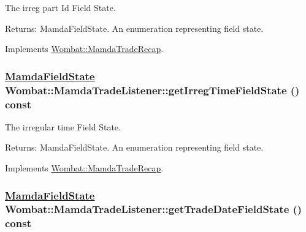 The irreg part Id Field State. 

\begin{Desc}
\item[Returns:]Mamda\-Field\-State. An enumeration representing field state. \end{Desc}


Implements \hyperlink{classWombat_1_1MamdaTradeRecap_7279903433d1059bf0fa02ea3af73f2d}{Wombat::Mamda\-Trade\-Recap}.\hypertarget{classWombat_1_1MamdaTradeListener_c5bf736fa985c2ee23694b11235e5933}{
\subsubsection[getIrregTimeFieldState]{\setlength{\rightskip}{0pt plus 5cm}\hyperlink{namespaceWombat_93aac974f2ab713554fd12a1fa3b7d2a}{Mamda\-Field\-State} Wombat::Mamda\-Trade\-Listener::get\-Irreg\-Time\-Field\-State () const}}
\label{classWombat_1_1MamdaTradeListener_c5bf736fa985c2ee23694b11235e5933}


The irregular time Field State. 

\begin{Desc}
\item[Returns:]Mamda\-Field\-State. An enumeration representing field state. \end{Desc}


Implements \hyperlink{classWombat_1_1MamdaTradeRecap_edaa9f3db0011e8175309628b7d17f09}{Wombat::Mamda\-Trade\-Recap}.\hypertarget{classWombat_1_1MamdaTradeListener_6ce7a7bba0ea6365f5e5fa3901ae7701}{
\subsubsection[getTradeDateFieldState]{\setlength{\rightskip}{0pt plus 5cm}\hyperlink{namespaceWombat_93aac974f2ab713554fd12a1fa3b7d2a}{Mamda\-Field\-State} Wombat::Mamda\-Trade\-Listener::get\-Trade\-Date\-Field\-State () const}}
\label{classWombat_1_1MamdaTradeListener_6ce7a7bba0ea6365f5e5fa3901ae7701}


